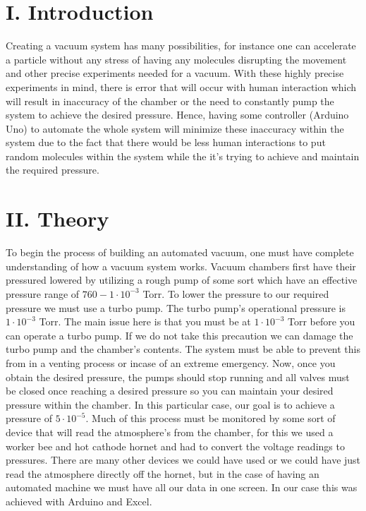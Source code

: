 \documentclass[aps,prl,twocolumn,showpacs,superscriptaddress,groupedaddress]{revtex4}  %
\begin{document}
\section{\label{sec: level1}I. Introduction}
Creating a vacuum system has many possibilities, for instance one can accelerate a particle without any stress of having any molecules disrupting the movement and other precise experiments needed for a vacuum. With these highly precise experiments in mind, there is error that will occur with human interaction which will result in inaccuracy of the chamber or the need to constantly pump the system to achieve the desired pressure. Hence, having some controller (Arduino Uno) to automate the whole system will minimize these inaccuracy within the system due to the fact that there would be less human interactions to put random molecules within the system while the it's trying to achieve and maintain the required pressure. 
\section{\label{sec: level2}II. Theory}
To begin the process of building an automated vacuum, one must have complete understanding of how a vacuum system works. Vacuum chambers first have their pressured lowered by utilizing a rough pump of some sort which have an effective pressure range of $760 - 1 \cdot 10^{-3}$ Torr. To lower the pressure to our required pressure we must use a turbo pump. The turbo pump's operational pressure is $1 \cdot 10^{-3}$ Torr. The main issue here is that you must be at $1 \cdot 10^{-3}$ Torr before you can operate a turbo pump. If we do not take this precaution we can damage the turbo pump and the chamber's contents. The system must be able to prevent this from in a venting process or incase of an extreme emergency. Now, once you obtain the desired pressure, the pumps should stop running and all valves must be closed once reaching a desired pressure so you can maintain your desired pressure within the chamber. In this particular case, our goal is to achieve a pressure of $5 \cdot 10^{-5}$. Much of this process must be monitored by some sort of device that will read the atmosphere's from the chamber, for this we used a worker bee and hot cathode hornet and had to convert the voltage readings to pressures. There are many other devices we could have used or we could have just read the atmosphere directly off the hornet, but in the case of having an automated machine we must have all our data in one screen. In our case this was achieved with Arduino and Excel. 
\end{document}
